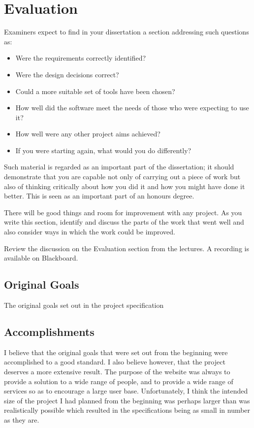 \chapter{Evaluation}

Examiners expect to find in your dissertation a section addressing such questions as:

\begin{itemize}
   \item Were the requirements correctly identified? 
   \item Were the design decisions correct?
   \item Could a more suitable set of tools have been chosen?
   \item How well did the software meet the needs of those who were expecting to use it?
   \item How well were any other project aims achieved?
   \item If you were starting again, what would you do differently?
\end{itemize}

Such material is regarded as an important part of the dissertation; it should demonstrate that you are capable not only of carrying out a piece of work but also of thinking critically about how you did it and how you might have done it better. This is seen as an important part of an honours degree. 

There will be good things and room for improvement with any project. As you write this section, identify and discuss the parts of the work that went well and also consider ways in which the work could be improved. 

Review the discussion on the Evaluation section from the lectures. A recording is available on Blackboard. 

\section{Original Goals}
The original goals set out in the project specification 

\section{Accomplishments}
I believe that the original goals that were set out from the beginning were accomplished to a good standard. I also believe however, that the project deserves a more extensive result. The purpose of the website was always to provide a solution to a wide range of people, and to provide a wide range of services so as to encourage a large user base. Unfortunately, I think the intended size of the project I had planned from the beginning was perhaps larger than was realistically possible which resulted in the specifications being as small in number as they are. 

